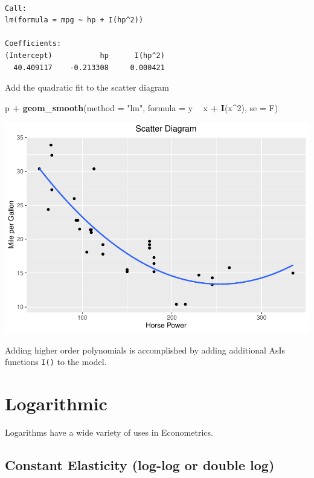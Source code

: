 \documentclass[]{book}
\newenvironment{Shaded}{\begin{snugshade}}{\end{snugshade}}
\newcommand{\DataTypeTok}[1]{\textcolor[rgb]{0.13,0.29,0.53}{#1}}
\newcommand{\DecValTok}[1]{\textcolor[rgb]{0.00,0.00,0.81}{#1}}
\newcommand{\KeywordTok}[1]{\textcolor[rgb]{0.13,0.29,0.53}{\textbf{#1}}}
\newcommand{\NormalTok}[1]{#1}
\newcommand{\OperatorTok}[1]{\textcolor[rgb]{0.81,0.36,0.00}{\textbf{#1}}}
\newcommand{\StringTok}[1]{\textcolor[rgb]{0.31,0.60,0.02}{#1}}
\begin{document}
\begin{verbatim}

Call:
lm(formula = mpg ~ hp + I(hp^2))

Coefficients:
(Intercept)           hp      I(hp^2)  
  40.409117    -0.213308     0.000421  
\end{verbatim}

Add the quadratic fit to the scatter diagram

\begin{Shaded}
\begin{Highlighting}[]
\NormalTok{p }\OperatorTok{+}\StringTok{ }
\StringTok{  }\KeywordTok{geom_smooth}\NormalTok{(}\DataTypeTok{method =} \StringTok{"lm"}\NormalTok{, }\DataTypeTok{formula =}\NormalTok{ y }\OperatorTok{~}\StringTok{  }\NormalTok{x }\OperatorTok{+}\StringTok{ }\KeywordTok{I}\NormalTok{(x}\OperatorTok{^}\DecValTok{2}\NormalTok{), }\DataTypeTok{se =}\NormalTok{ F)}
\end{Highlighting}
\end{Shaded}

\includegraphics{bailey_files/figure-latex/unnamed-chunk-80-1.pdf}

Adding higher order polynomials is accomplished by adding additional AsIs functions \texttt{I()} to the model.

\hypertarget{logarithmic}{%
\section{Logarithmic}\label{logarithmic}}

Logarithms have a wide variety of uses in Econometrics.

\hypertarget{constant-elasticity-log-log-or-double-log}{%
\subsection{Constant Elasticity (log-log or double log)}\label{constant-elasticity-log-log-or-double-log}}
\end{document}
